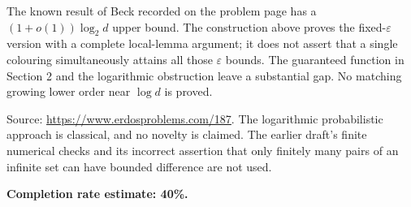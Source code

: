 The known result of Beck recorded on the problem page has a $(1+o(1))\log_2d$ upper bound. The construction above proves the fixed-$\varepsilon$ version with a complete local-lemma argument; it does not assert that a single colouring simultaneously attains all those $\varepsilon$ bounds. The guaranteed function in Section 2 and the logarithmic obstruction leave a substantial gap. No matching growing lower order near $\log d$ is proved.

Source: \url{https://www.erdosproblems.com/187}. The logarithmic probabilistic approach is classical, and no novelty is claimed. The earlier draft's finite numerical checks and its incorrect assertion that only finitely many pairs of an infinite set can have bounded difference are not used.

\textbf{Completion rate estimate: 40\%.}


